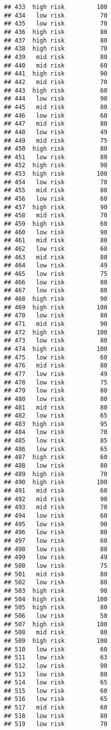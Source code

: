 \documentclass[
  ignorenonframetext,
]{beamer}
\begin{document}
\begin{frame}[fragile]
\begin{verbatim}
## 433  high risk         100
## 434   low risk          70
## 435   low risk          70
## 436  high risk          80
## 437  high risk          80
## 438  high risk          70
## 439   mid risk          80
## 440   mid risk          60
## 441  high risk          90
## 442   mid risk          70
## 443  high risk          60
## 444   low risk          90
## 445   mid risk          80
## 446   low risk          60
## 447   mid risk          80
## 448   low risk          49
## 449   mid risk          75
## 450  high risk          80
## 451   low risk          80
## 452  high risk          90
## 453  high risk         100
## 454   low risk          70
## 455   mid risk          80
## 456   low risk          60
## 457  high risk          90
## 458   mid risk          70
## 459  high risk          60
## 460   low risk          90
## 461   mid risk          80
## 462   low risk          60
## 463   mid risk          80
## 464   low risk          49
## 465   low risk          75
## 466   low risk          80
## 467   low risk          80
## 468  high risk          90
## 469  high risk         100
## 470   low risk          80
## 471   mid risk          90
## 472  high risk         100
## 473   low risk          80
## 474  high risk         100
## 475   low risk          60
## 476   mid risk          80
## 477   low risk          49
## 478   low risk          75
## 479   low risk          80
## 480   low risk          80
## 481   mid risk          80
## 482   low risk          65
## 483  high risk          95
## 484   low risk          70
## 485   low risk          85
## 486   low risk          65
## 487  high risk          60
## 488   low risk          80
## 489  high risk          70
## 490  high risk         100
## 491   mid risk          60
## 492   mid risk          90
## 493   mid risk          70
## 494   low risk          60
## 495   low risk          90
## 496   low risk          80
## 497   low risk          60
## 498   low risk          80
## 499   low risk          49
## 500   low risk          75
## 501   mid risk          80
## 502   low risk          80
## 503  high risk          90
## 504  high risk         100
## 505  high risk          80
## 506   low risk          50
## 507  high risk         100
## 508   mid risk          80
## 509  high risk         100
## 510   low risk          60
## 511   low risk          63
## 512   low risk          90
## 513   low risk          80
## 514   low risk          65
## 515   low risk          60
## 516   low risk          65
## 517   mid risk          60
## 518   low risk          80
## 519   low risk          70

\end{verbatim}
\end{frame}
\end{document}
